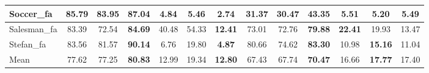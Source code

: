 \documentclass[runningheads]{llncs}
\begin{document}
\begin{table}[]
\begin{center}
\begin{adjustbox}{max width=\textwidth}
\begin{tabular}{|l|c|c|c|c|c|c|c|c|c|c|c|c|}
Soccer\_fa    & 85.79                   & 83.95          & \textbf{87.04} & 4.84                    & 5.46           & \textbf{2.74}  & 31.37                   & 30.47 & \textbf{43.35} & \textbf{5.51}           & 5.20           & 5.49           \\ \hline
Salesman\_fa  & 83.39                   & 72.54          & \textbf{84.69} & 40.48                   & 54.33          & \textbf{12.41} & 73.01                   & 72.76 & \textbf{79.88} & \textbf{22.41}          & 19.93          & 13.47          \\ \hline
Stefan\_fa    & 83.56                   & 81.57          & \textbf{90.14} & 6.76                    & 19.80          & \textbf{4.87}  & 80.66                   & 74.62 & \textbf{83.30} & 10.98                   & \textbf{15.16} & 11.04          \\ \hline
Mean          & 77.62                   & 77.25          & \textbf{80.83} & 12.99                   & 19.34          & \textbf{12.80} & 67.43                   & 67.74 & \textbf{70.47} & 16.66                   & \textbf{17.77} & 17.40          \\ \hline
\end{tabular}
\end{adjustbox}
\end{center}
\end{table}
\end{document}
